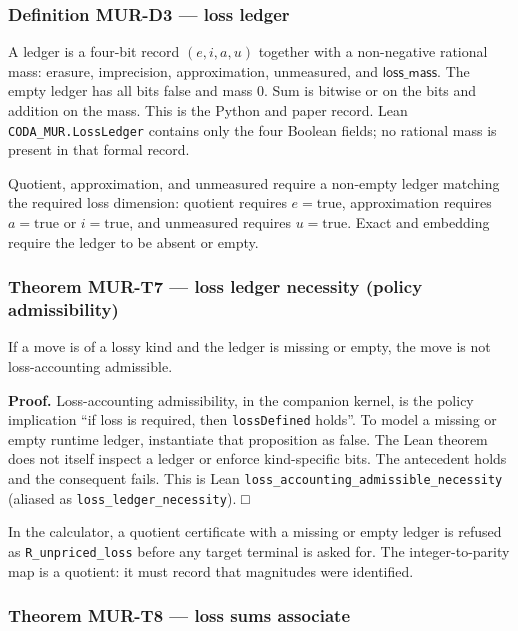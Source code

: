 \documentclass[
  11pt,
]{article}
\begin{document}
\subsubsection{Definition MUR-D3 --- loss ledger}\label{definition-mur-d3-loss-ledger}

A ledger is a four-bit record \((e,i,a,u)\) together with a non-negative rational mass: erasure, imprecision, approximation, unmeasured, and \(\mathsf{loss\_mass}\). The empty ledger has all bits false and mass \(0\). Sum is bitwise or on the bits and addition on the mass. This is the Python and paper record. Lean \nolinkurl{CODA_MUR.LossLedger} contains only the four Boolean fields; no rational mass is present in that formal record.

Quotient, approximation, and unmeasured require a non-empty ledger matching the required loss dimension: quotient requires \(e=\mathrm{true}\), approximation requires \(a=\mathrm{true}\) or \(i=\mathrm{true}\), and unmeasured requires \(u=\mathrm{true}\). Exact and embedding require the ledger to be absent or empty.

\subsubsection{Theorem MUR-T7 --- loss ledger necessity (policy admissibility)}\label{theorem-mur-t7-loss-ledger-necessity-policy-admissibility}

If a move is of a lossy kind and the ledger is missing or empty, the move is not loss-accounting admissible.

\textbf{Proof.} Loss-accounting admissibility, in the companion kernel, is the policy implication ``if loss is required, then \texttt{lossDefined} holds''. To model a missing or empty runtime ledger, instantiate that proposition as false. The Lean theorem does not itself inspect a ledger or enforce kind-specific bits. The antecedent holds and the consequent fails. This is Lean \nolinkurl{loss_accounting_admissible_necessity} (aliased as \nolinkurl{loss_ledger_necessity}). □

In the calculator, a quotient certificate with a missing or empty ledger is refused as \texttt{R\_unpriced\_loss} before any target terminal is asked for. The integer-to-parity map is a quotient: it must record that magnitudes were identified.

\subsubsection{Theorem MUR-T8 --- loss sums associate}\label{theorem-mur-t8-loss-sums-associate}
\end{document}
